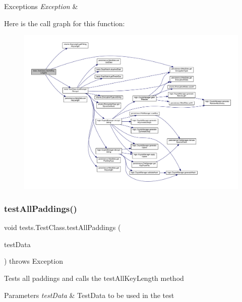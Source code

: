 \begin{DoxyExceptions}{Exceptions}
{\em Exception} & \\
\hline
\end{DoxyExceptions}
Here is the call graph for this function\+:
\nopagebreak
\begin{figure}[H]
\begin{center}
\leavevmode
\includegraphics[width=350pt]{classtests_1_1_test_class_a8bf4e8d943fa1d61fbaa615dcefeca69_cgraph}
\end{center}
\end{figure}
\mbox{\label{classtests_1_1_test_class_ad9f19e80ff161cfedfbfe4ba527c0074}} 
\subsubsection{\texorpdfstring{test\+All\+Paddings()}{testAllPaddings()}}
{\footnotesize\ttfamily void tests.\+Test\+Class.\+test\+All\+Paddings (\begin{DoxyParamCaption}\item[{\mbox{\hyperlink{classpersistence_1_1_meta_data}{Meta\+Data}}}]{test\+Data }\end{DoxyParamCaption}) throws Exception\hspace{0.3cm}{\ttfamily [private]}}

Tests all paddings and calls the test\+All\+Key\+Length method 
\begin{DoxyParams}{Parameters}
{\em test\+Data} & Test\+Data to be used in the test \\
\hline
\end{DoxyParams}

